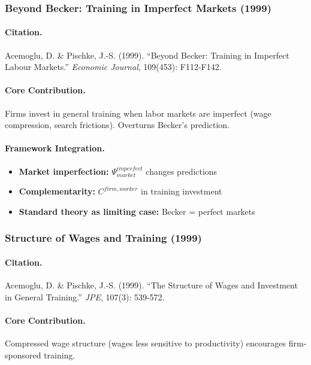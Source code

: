 \subsubsection{Beyond Becker: Training in Imperfect Markets (1999)}

\paragraph{Citation.}
Acemoglu, D. \& Pischke, J.-S. (1999).
``Beyond Becker: Training in Imperfect Labour Markets.''
\emph{Economic Journal}, 109(453): F112-F142.

\paragraph{Core Contribution.}
Firms invest in general training when labor markets are imperfect
(wage compression, search frictions). Overturns Becker's prediction.

\paragraph{Framework Integration.}
\begin{itemize}
  \item \textbf{Market imperfection:} $\Psi_{market}^{imperfect}$ changes predictions
  \item \textbf{Complementarity:} $C^{firm,worker}$ in training investment
  \item \textbf{Standard theory as limiting case:} Becker = perfect markets
\end{itemize}

\subsubsection{Structure of Wages and Training (1999)}

\paragraph{Citation.}
Acemoglu, D. \& Pischke, J.-S. (1999).
``The Structure of Wages and Investment in General Training.''
\emph{JPE}, 107(3): 539-572.

\paragraph{Core Contribution.}
Compressed wage structure (wages less sensitive to productivity)
encourages firm-sponsored training.

